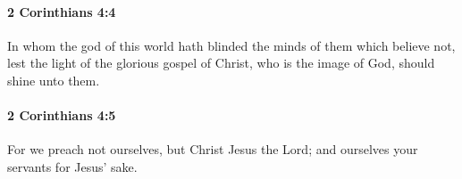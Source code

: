 		\paragraph{2 Corinthians 4:4} %
			\label{2CORINTHIANS-4-4}

			In whom the god of this world hath blinded the minds of them which believe not, lest the light of the glorious gospel of Christ, who is the image of God, should shine unto them.

			\begin{framed}
			\scriptsize
				\begin{compactdesc}
					\item[SBLG] 
				\end{compactdesc}
			\end{framed}

		\paragraph{2 Corinthians 4:5} %
			\label{2CORINTHIANS-4-5}

			For we preach not ourselves, but Christ Jesus the Lord; and ourselves your servants for Jesus' sake.

